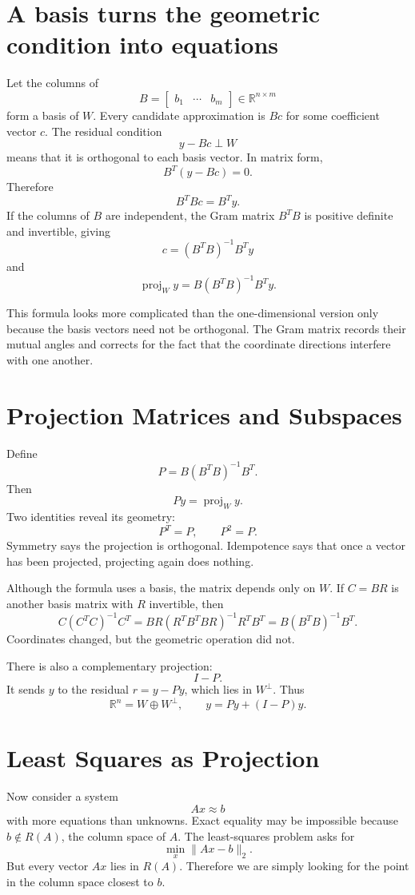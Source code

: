 \section{A basis turns the geometric condition into equations}

Let the columns of
\[
  B=\begin{bmatrix}b_1&\cdots&b_m\end{bmatrix}
  \in\mathbb R^{n\times m}
\]
form a basis of \(W\).  Every candidate approximation is \(Bc\) for some coefficient vector \(c\).  The residual condition
\[
  y-Bc\perp W
\]
means that it is orthogonal to each basis vector.  In matrix form,
\[
  B^T(y-Bc)=0.
\]
Therefore
\[
  B^TBc=B^Ty.
\]
If the columns of \(B\) are independent, the Gram matrix \(B^TB\) is positive definite and invertible, giving
\[
  c=(B^TB)^{-1}B^Ty
\]
and
\[
  \boxed{
  \operatorname{proj}_W y
  =B(B^TB)^{-1}B^Ty.}
\]

This formula looks more complicated than the one-dimensional version only because the basis vectors need not be orthogonal.  The Gram matrix records their mutual angles and corrects for the fact that the coordinate directions interfere with one another.

\section{Projection Matrices and Subspaces}

Define
\[
  P=B(B^TB)^{-1}B^T.
\]
Then
\[
  Py=\operatorname{proj}_W y.
\]
Two identities reveal its geometry:
\[
  P^T=P,
  \qquad
  P^2=P.
\]
Symmetry says the projection is orthogonal.  Idempotence says that once a vector has been projected, projecting again does nothing.

Although the formula uses a basis, the matrix depends only on \(W\).  If \(C=BR\) is another basis matrix with \(R\) invertible, then
\[
  C(C^TC)^{-1}C^T
  =BR(R^TB^TBR)^{-1}R^TB^T
  =B(B^TB)^{-1}B^T.
\]
Coordinates changed, but the geometric operation did not.

There is also a complementary projection:
\[
  I-P.
\]
It sends \(y\) to the residual \(r=y-Py\), which lies in \(W^\perp\).  Thus
\[
  \mathbb R^n=W\oplus W^\perp,
  \qquad
  y=Py+(I-P)y.
\]

\section{Least Squares as Projection}

Now consider a system
\[
  Ax\approx b
\]
with more equations than unknowns.  Exact equality may be impossible because \(b\notin R(A)\), the column space of \(A\).  The least-squares problem asks for
\[
  \min_x\|Ax-b\|_2.
\]
But every vector \(Ax\) lies in \(R(A)\).  Therefore we are simply looking for the point in the column space closest to \(b\).

